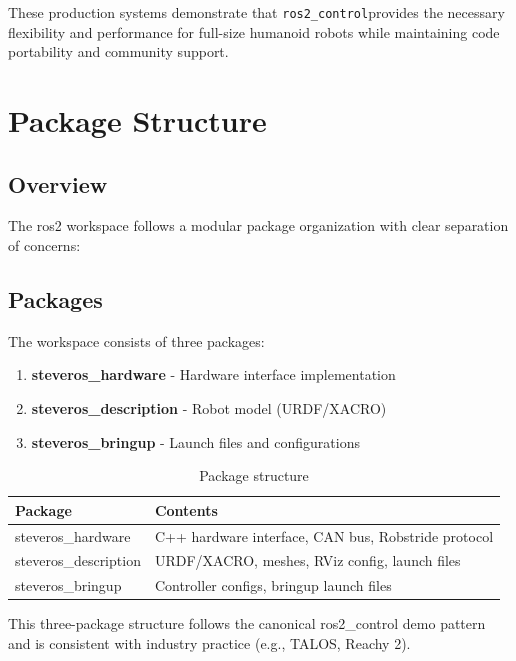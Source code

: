 \documentclass[12pt,a4paper]{article}
\newcommand{\code}[1]{\texttt{#1}}
\newcommand{\rc}{\code{ros2\_control}}
\begin{document}
These production systems demonstrate that \rc provides the necessary flexibility 
and performance for full-size humanoid robots while maintaining code portability 
and community support.

\section{Package Structure}

\subsection{Overview}
The ros2 workspace follows a modular package organization with clear separation 
of concerns:

\subsection{Packages}

The workspace consists of three packages:

\begin{enumerate}
    \item \textbf{steveros\_hardware} - Hardware interface implementation
    \item \textbf{steveros\_description} - Robot model (URDF/XACRO)
    \item \textbf{steveros\_bringup} - Launch files and configurations
\end{enumerate}

\begin{table}[h]
    \centering
    \begin{tabular}{|l|p{6cm}|}
        \hline
        \textbf{Package} & \textbf{Contents} \\
        \hline
        steveros\_hardware & C++ hardware interface, CAN bus, Robstride protocol \\
        \hline
        steveros\_description & URDF/XACRO, meshes, RViz config, launch files \\
        \hline
        steveros\_bringup & Controller configs, bringup launch files \\
        \hline
    \end{tabular}
    \caption{Package structure}
\end{table}

This three-package structure follows the canonical ros2\_control demo pattern and 
is consistent with industry practice (e.g., TALOS, Reachy 2).
\end{document}
